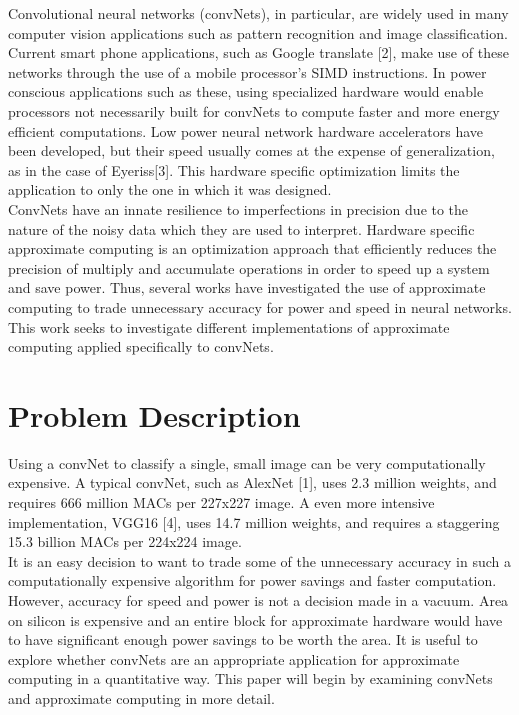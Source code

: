 \documentclass[journal]{IEEEtran}
\begin{document}
	\indent Convolutional neural networks (convNets), in particular, are widely used in many computer vision applications such as pattern recognition and image classification. Current smart phone applications, such as Google translate [2], make use of these networks through the use of a mobile processor's SIMD instructions. In power conscious applications such as these, using specialized hardware would enable processors not necessarily built for convNets to compute faster and more energy efficient computations. Low power neural network hardware accelerators have been developed, but their speed usually comes at the expense of generalization, as in the case of Eyeriss[3]. This hardware specific optimization limits the application to only the one in which it was designed. \\	
	
	\indent ConvNets have an innate resilience to imperfections in precision due to the nature of the noisy data which they are used to interpret. Hardware specific approximate computing is an optimization approach that efficiently reduces the precision of multiply and accumulate operations in order to speed up a system and save power. Thus, several works have investigated the use of approximate computing to trade unnecessary accuracy for power and speed in neural networks. This work seeks to investigate different implementations of approximate computing applied specifically to convNets. 

\section{Problem Description}
	\indent Using a convNet to classify a single, small image can be very computationally expensive. A typical convNet, such as AlexNet [1], uses 2.3 million weights, and requires 666 million MACs per 227x227 image. A even more intensive implementation, VGG16 [4], uses 14.7 million weights, and requires a staggering 15.3 billion MACs per 224x224 image.\\
	
	\indent It is an easy decision to want to trade some of the unnecessary accuracy in such a computationally expensive algorithm for power savings and faster computation. However, accuracy for speed and power is not a decision made in a vacuum. Area on silicon is expensive and an entire block for approximate hardware would have to have significant enough power savings to be worth the area. It is useful to explore whether convNets are an appropriate application for approximate computing in a quantitative way. This paper will begin by examining convNets and approximate computing in more detail.
\end{document}

